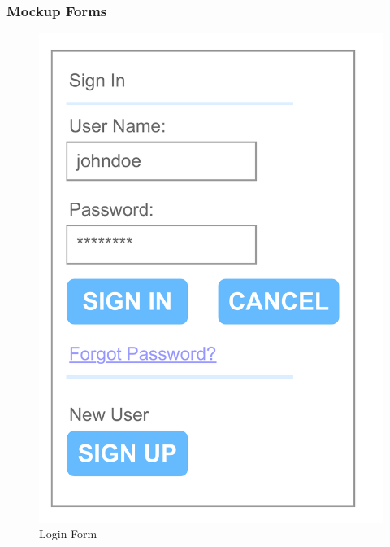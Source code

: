 \documentclass{article}
\begin{document}
        \subsubsection{Mockup Forms}
        \begin{figure}[H]
                \centering
                \includegraphics[width=\textwidth, width = 0.25\columnwidth, trim = 0 50 0 0, clip]{images/design/Login_Form.pdf}
                \caption{Login Form}
                \label{fig:ie_2}
        \end{figure}
\end{document}
